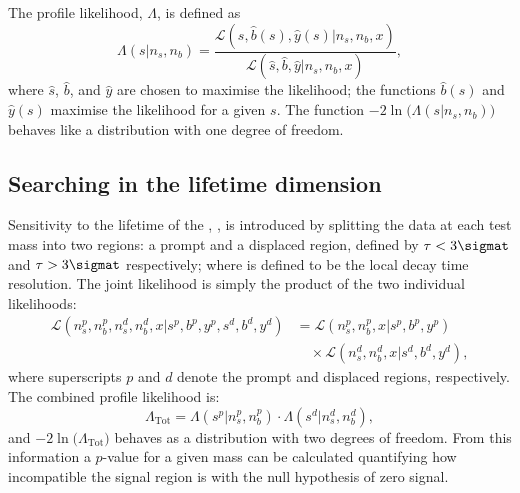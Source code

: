 
The profile likelihood, $\Lambda$, is defined as
\begin{equation}
  \Lambda(s|n_s,n_b) =
  \frac
  {\mathcal{L}(s, \hat{b}(s), \hat{y}(s) | n_s, n_b, x)}
  {\mathcal{L}(\hat{s}, \hat{b}, \hat{y} | n_s, n_b, x)},
  \label{eq:profilelike1}
\end{equation}
where $\hat{s}$, $\hat{b}$, and $\hat{y}$ are chosen to maximise the likelihood; the functions
$\hat{b}(s)$ and $\hat{y}(s)$ maximise the likelihood for a given $s$.
The function $-2\ln\big(\Lambda(s|n_s,n_b)\big)$ behaves like a \chisq distribution with one degree
of freedom.


\subsection{Searching in the lifetime dimension}
Sensitivity to the lifetime of the \db, \lifetime{\db}, is introduced by splitting the data at each
test mass into two regions: a prompt and a displaced region, defined by $\tau<3\sigmat$ and
$\tau>3\sigmat$ respectively; where \sigmat is defined to be the local decay time resolution.
The joint likelihood is simply the product of the two individual likelihoods:
\begin{align}
  \mathcal{L}(n^p_s, n^p_b, n^d_s, n^d_b, x | s^p, b^p, y^p, s^d, b^d, y^d) &=
  \mathcal{L}(n^p_s, n^p_b, x | s^p, b^p, y^p)\nonumber\\
  &\quad\times\mathcal{L}(n^d_s, n^d_b, x | s^d, b^d, y^d),
  \label{eq:db:liketau}
\end{align}
where superscripts $p$ and $d$ denote the prompt and displaced regions,
respectively.
The combined profile likelihood is:
\begin{equation}
  \Lambda_\mathrm{Tot}
  =
  \Lambda(s^p|n_s^p,n_b^p)\cdot
  \Lambda(s^d|n_s^d,n_b^d),
\end{equation}
and $-2\ln\big(\Lambda_\mathrm{Tot}\big)$ behaves as a \chisq distribution with two
degrees of freedom.
From this information a $p$-value for a given mass can be calculated
quantifying how incompatible the signal region is with the null
hypothesis of zero signal.

